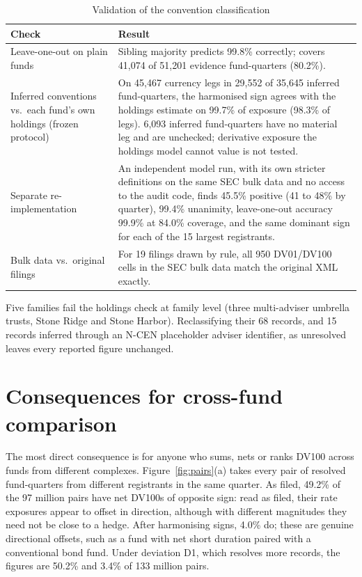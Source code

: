 \documentclass[11pt]{article}
\begin{document}
\begin{table}[!htb]
\centering\small
\begin{threeparttable}
\caption{Validation of the convention classification}\label{tab:validation}
\begin{tabularx}{\linewidth}{>{\raggedright\arraybackslash}p{4.2cm}X}
\toprule
Check & Result \\
\midrule
Leave-one-out on plain funds & Sibling majority predicts 99.8\% correctly; covers 41,074 of 51,201
evidence fund-quarters (80.2\%). \\
Inferred conventions vs.\ each fund's own holdings (frozen protocol) & On 45,467 currency legs in 29,552
of 35,645 inferred fund-quarters, the harmonised sign agrees with the holdings estimate on 99.7\% of
exposure (98.3\% of legs). 6,093 inferred fund-quarters have no material leg and are unchecked;
derivative exposure the holdings model cannot value is not tested. \\
Separate re-implementation & An independent model run, with its own stricter definitions on the same
SEC bulk data and no access to the audit code, finds 45.5\% positive (41 to 48\% by quarter), 99.4\%
unanimity, leave-one-out accuracy 99.9\% at 84.0\% coverage, and the same dominant sign for each of
the 15 largest registrants. \\
Bulk data vs.\ original filings & For 19 filings drawn by rule, all 950 DV01/DV100 cells in the SEC
bulk data match the original XML exactly. \\
\bottomrule
\end{tabularx}
\begin{tablenotes}\footnotesize
\item Five families fail the holdings check at family level (three multi-adviser umbrella trusts, Stone
Ridge and Stone Harbor). Reclassifying their 68 records, and 15 records inferred through an N-CEN
placeholder adviser identifier, as unresolved leaves every reported figure unchanged.
\end{tablenotes}
\end{threeparttable}
\end{table}

\section{Consequences for cross-fund comparison}\label{sec:consequences}

The most direct consequence is for anyone who sums, nets or ranks DV100 across funds from different
complexes. Figure~\ref{fig:pairs}(a) takes every pair of resolved fund-quarters from different
registrants in the same quarter. As filed, 49.2\% of the 97 million pairs have net DV100s of
opposite sign: read as filed, their rate exposures appear to offset in direction, although with different magnitudes they need not be close to a hedge. After harmonising signs, 4.0\% do; these are genuine directional offsets, such as a fund with net short duration paired with a conventional bond fund. Under deviation D1,
which resolves more records, the figures are 50.2\% and 3.4\% of 133 million pairs.
\end{document}
